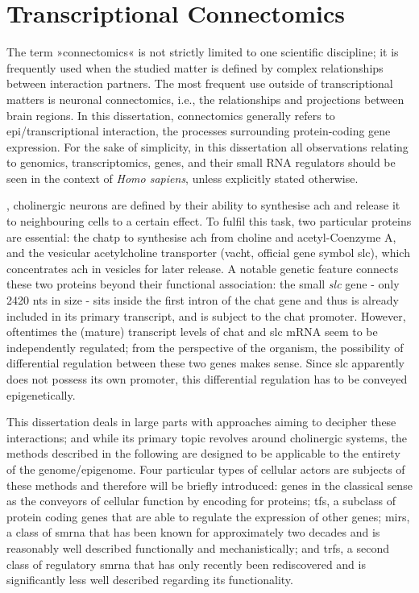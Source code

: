 \newpage

\section{Transcriptional Connectomics}
The term »connectomics« is not strictly limited to one scientific discipline; it is frequently used when the studied matter is defined by complex relationships between interaction partners. The most frequent use outside of transcriptional matters is neuronal connectomics, i.e., the relationships and projections between brain regions. In this dissertation, connectomics generally refers to epi\-/transcriptional interaction, the processes surrounding protein-coding gene expression. For the sake of simplicity, in this dissertation all observations relating to genomics, transcriptomics, genes, and their small RNA regulators should be seen in the context of \textit{Homo sapiens}, unless explicitly stated otherwise.

, cholinergic neurons are defined by their ability to synthesise \ac{ach} and release it to neighbouring cells to a certain effect. To fulfil this task, two particular proteins are essential: the \acf{chatp} to synthesise \ac{ach} from choline and acetyl-Coenzyme A, and the vesicular acetylcholine transporter (\acs{vacht}, official gene symbol \acs{slc}), which concentrates \ac{ach} in vesicles for later release. A notable genetic feature connects these two proteins beyond their functional association: the small \textit{\ac{slc}} gene - only 2420 \acp{nt} in size - sits inside the first intron of the \ac{chat} gene and thus is already included in its primary transcript, and is subject to the \ac{chat} promoter. However, oftentimes the (mature) transcript levels of \ac{chat} and \ac{slc} mRNA seem to be independently regulated; from the perspective of the organism, the possibility of differential regulation between these two genes makes sense. Since \ac{slc} apparently does not possess its own promoter, this differential regulation has to be conveyed epigenetically. 

This dissertation deals in large parts with approaches aiming to decipher these interactions; and while its primary topic revolves around cholinergic systems, the methods described in the following are designed to be applicable to the entirety of the genome/epigenome. Four particular types of cellular actors are subjects of these methods and therefore will be briefly introduced: genes in the classical sense as the conveyors of cellular function by encoding for proteins; \acp{tf}, a subclass of protein coding genes that are able to regulate the expression of other genes; \acp{mir}, a class of \ac{smrna} that has been known for approximately two decades and is reasonably well described functionally and mechanistically; and \acp{trf}, a second class of regulatory \ac{smrna} that has only recently been rediscovered and is significantly less well described regarding its functionality.

